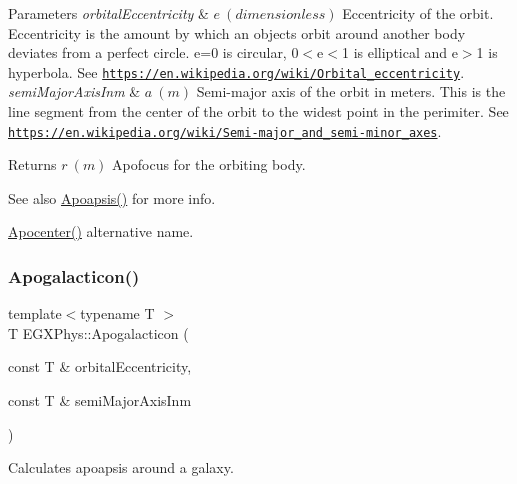 \begin{DoxyParams}{Parameters}
{\em orbital\+Eccentricity} & $ e\ (dimensionless)$ Eccentricity of the orbit. Eccentricity is the amount by which an objects orbit around another body deviates from a perfect circle. e=0 is circular, 0$<$e$<$1 is elliptical and e$>$1 is hyperbola. See \href{https://en.wikipedia.org/wiki/Orbital_eccentricity}{\tt https\+://en.\+wikipedia.\+org/wiki/\+Orbital\+\_\+eccentricity}. \\
\hline
{\em semi\+Major\+Axis\+Inm} & $ a\ (m)$ Semi-\/major axis of the orbit in meters. This is the line segment from the center of the orbit to the widest point in the perimiter. See \href{https://en.wikipedia.org/wiki/Semi-major_and_semi-minor_axes}{\tt https\+://en.\+wikipedia.\+org/wiki/\+Semi-\/major\+\_\+and\+\_\+semi-\/minor\+\_\+axes}. \\
\hline
\end{DoxyParams}
\begin{DoxyReturn}{Returns}
$ r\ (m)$ Apofocus for the orbiting body. 
\end{DoxyReturn}
\begin{DoxySeeAlso}{See also}
\mbox{\hyperlink{group___e_g_x_phys-_apoapsis_gafd08a2d1d64886e7bb9bcb7ff65bc3ea}{Apoapsis()}} for more info. 

\mbox{\hyperlink{group___e_g_x_phys-_apoapsis_gaacffba78614c5b4d5488d8e9b8c661ee}{Apocenter()}} alternative name. 
\end{DoxySeeAlso}
\mbox{\label{group___e_g_x_phys-_apoapsis_gafef7ad033b39c29cdfe624cd48a6d616}} 
\subsubsection{\texorpdfstring{Apogalacticon()}{Apogalacticon()}}
{\footnotesize\ttfamily template$<$typename T $>$ \\
T E\+G\+X\+Phys\+::\+Apogalacticon (\begin{DoxyParamCaption}\item[{const T \&}]{orbital\+Eccentricity,  }\item[{const T \&}]{semi\+Major\+Axis\+Inm }\end{DoxyParamCaption})}



Calculates apoapsis around a galaxy. 


